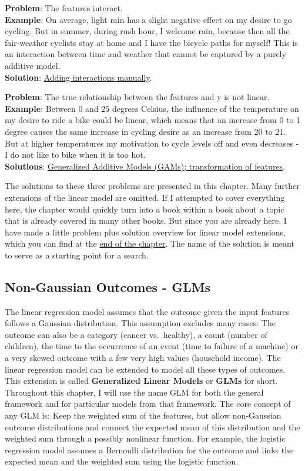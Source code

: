 \documentclass[
  10pt,
]{scrbook}
\begin{document}
\textbf{Problem}: The features interact.\\
\textbf{Example}: On average, light rain has a slight negative effect on my desire to go cycling.
But in summer, during rush hour, I welcome rain, because then all the fair-weather cyclists stay at home and I have the bicycle paths for myself!
This is an interaction between time and weather that cannot be captured by a purely additive model.\\
\textbf{Solution}: \protect\hyperlink{lm-interact}{Adding interactions manually}.

\textbf{Problem}: The true relationship between the features and y is not linear.\\
\textbf{Example}: Between 0 and 25 degrees Celsius, the influence of the temperature on my desire to ride a bike could be linear, which means that an increase from 0 to 1 degree causes the same increase in cycling desire as an increase from 20 to 21.
But at higher temperatures my motivation to cycle levels off and even decreases - I do not like to bike when it is too hot.\\
\textbf{Solutions}: \protect\hyperlink{gam}{Generalized Additive Models (GAMs); transformation of features}.

The solutions to these three problems are presented in this chapter.
Many further extensions of the linear model are omitted.
If I attempted to cover everything here, the chapter would quickly turn into a book within a book about a topic that is already covered in many other books.
But since you are already here, I have made a little problem plus solution overview for linear model extensions, which you can find at the \protect\hyperlink{more-lm-extension}{end of the chapter}.
The name of the solution is meant to serve as a starting point for a search.

\hypertarget{glm}{%
\subsection{Non-Gaussian Outcomes - GLMs}\label{glm}}

The linear regression model assumes that the outcome given the input features follows a Gaussian distribution.
This assumption excludes many cases:
The outcome can also be a category (cancer vs.~healthy), a count (number of children), the time to the occurrence of an event (time to failure of a machine) or a very skewed outcome with a few very high values (household income).
The linear regression model can be extended to model all these types of outcomes.
This extension is called \textbf{Generalized Linear Models} or \textbf{GLMs} for short.
Throughout this chapter, I will use the name GLM for both the general framework and for particular models from that framework.
The core concept of any GLM is:
Keep the weighted sum of the features, but allow non-Gaussian outcome distributions and connect the expected mean of this distribution and the weighted sum through a possibly nonlinear function.
For example, the logistic regression model assumes a Bernoulli distribution for the outcome and links the expected mean and the weighted sum using the logistic function.
\end{document}
